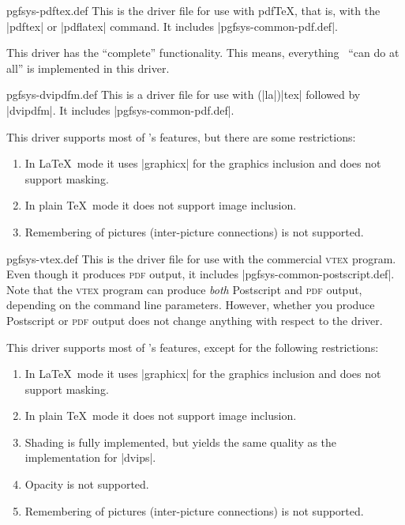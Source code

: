 \begin{filedescription}{pgfsys-pdftex.def}
  This is the driver file for use with pdf\TeX, that is, with the
  |pdftex| or |pdflatex| command. It includes
  |pgfsys-common-pdf.def|.

  This driver has the ``complete'' functionality. This means,
  everything \pgfname\ ``can do at all'' is implemented in this
  driver. 
\end{filedescription}

\begin{filedescription}{pgfsys-dvipdfm.def}
  This is a driver file for use with (|la|)|tex| followed by |dvipdfm|. It
  includes |pgfsys-common-pdf.def|.

  This driver supports most of \pgfname's features, but there are some
  restrictions:
  \begin{enumerate}
  \item
    In \LaTeX\ mode it uses |graphicx| for the graphics
    inclusion and does not support masking.
  \item
    In plain \TeX\ mode it does not support image inclusion.
  \item
    Remembering of pictures (inter-picture connections) is not
    supported. 
  \end{enumerate}
\end{filedescription}

\begin{filedescription}{pgfsys-vtex.def}
  This is the driver file for use with the commercial \textsc{vtex}
  program. Even though it produces  \textsc{pdf} output, it
  includes |pgfsys-common-postscript.def|. Note that the
  \textsc{vtex} program can produce \emph{both} Postscript and
  \textsc{pdf} output, depending on the command line
  parameters. However, whether you produce Postscript or
  \textsc{pdf} output does not change anything with respect to the
  driver. 

  This driver supports most of \pgfname's features, except for
  the following restrictions:
  \begin{enumerate}
  \item
    In \LaTeX\ mode it uses |graphicx| for the graphics
    inclusion and does not support masking.
  \item
    In plain \TeX\ mode it does not support image inclusion.
  \item
    Shading is fully implemented, but yields the same quality as the
    implementation for |dvips|.
  \item
    Opacity is not supported.
  \item
    Remembering of pictures (inter-picture connections) is not
    supported. 
  \end{enumerate}
\end{filedescription}

